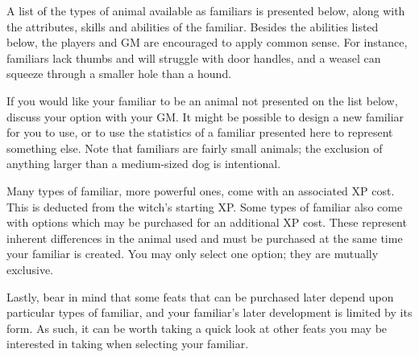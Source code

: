 A list of the types of animal available as familiars is presented below, along with the attributes, skills and abilities of the familiar.
Besides the abilities listed below, the players and GM are encouraged to apply common sense.
For instance, familiars lack thumbs and will struggle with door handles, and a weasel can squeeze through a smaller hole than a hound.

If you would like your familiar to be an animal not presented on the list below, discuss your option with your GM.
It might be possible to design a new familiar for you to use, or to use the statistics of a familiar presented here to represent something else.
Note that familiars are fairly small animals; the exclusion of anything larger than a medium-sized dog is intentional.

Many types of familiar, more powerful ones, come with an associated XP cost.
This is deducted from the witch's starting XP.
Some types of familiar also come with options which may be purchased for an additional XP cost.
These represent inherent differences in the animal used and must be purchased at the same time your familiar is created.
You may only select one option; they are mutually exclusive.

Lastly, bear in mind that some feats that can be purchased later depend upon particular types of familiar, and your familiar's later development is limited by its form.
As such, it can be worth taking a quick look at other feats you may be interested in taking when selecting your familiar.



